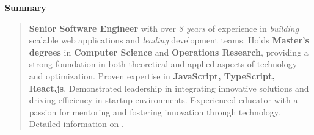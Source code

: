 \newcommand{\cvsummary}[1]{
  \vspace{1em}
  \par\noindent\textbf{\large Summary}\par
  \vspace{0.5em}
  \begin{quote}
    \small #1
  \end{quote}
  \vspace{1em}
}

\cvsummary{
  \textbf{Senior Software Engineer} with over \textit{8 years} of experience in \textit{building} scalable web applications and \textit{leading} development teams.
  Holds \textbf{Master's degrees} in \textbf{Computer Science} and \textbf{Operations Research}, providing a strong foundation in both theoretical and applied aspects of technology and optimization.
  Proven expertise in \textbf{JavaScript, TypeScript, React.js}. Demonstrated leadership in integrating innovative solutions and driving efficiency in startup environments.
  Experienced educator with a passion for mentoring and fostering innovation through technology. Detailed information on \linkto{LinkedIn}.
}
